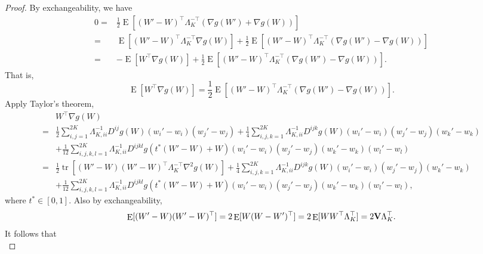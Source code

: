 \documentclass[11pt]{article}
\DeclareMathOperator{\mytr}{tr}
\DeclareMathOperator{\myE}{E}
\theoremstyle{plain}
\theoremstyle{definition}
\theoremstyle{remark}
\begin{document}
\begin{proof}
By exchangeability, we have
\begin{equation*}
    \begin{split}
        0=&\frac 1 2 \myE [(W'-W)^\top \Lambda_K^{-\top} (\nabla g(W') +\nabla g(W))]
        \\
        =& \myE [(W'-W)^\top \Lambda_K^{-\top} \nabla g(W)]
        +\frac{1}{2} \myE [(W'-W)^\top \Lambda_K^{-\top} (\nabla g(W') -\nabla g(W))]
        \\
        =&
        - \myE [W^\top  \nabla g(W)]
        +\frac{1}{2} \myE [(W'-W)^\top \Lambda_K^{-\top} (\nabla g(W') -\nabla g(W))].
    \end{split}
\end{equation*}
That is,
\begin{equation*}
         \myE [W^\top  \nabla g(W)]
         =
        \frac{1}{2} \myE [(W'-W)^\top \Lambda_K^{-\top} (\nabla g(W') -\nabla g(W))].
\end{equation*}
Apply Taylor's theorem,
\begin{equation}
    \begin{split}
         &W^\top  \nabla g(W)
         \\
         =&
         \frac 1 2 \sum_{i,j=1}^{2K}
         \Lambda_{K,ii}^{-1} D^{ij} g(W) (w_i'-w_i) (w_j'-w_j)
         +
         \frac 1 4 \sum_{i,j,k=1}^{2K}
         \Lambda_{K,ii}^{-1} D^{ijk} g(W) (w_i'-w_i) (w_j'-w_j)(w_k'-w_k)
         \\
         &+
         \frac{1}{12} \sum_{i,j,k,l=1}^{2K}
         \Lambda_{K,ii}^{-1} D^{ijkl} g(t^*(W'-W)+W) (w_i'-w_i) (w_j'-w_j)(w_k'-w_k) (w_l'-w_l)
         \\
         =&
         \frac 1 2 
         \mytr
         [
         (W'-W)
         (W'-W)^\top \Lambda_K^{-\top} \nabla^2 g(W)
     ]
         +
         \frac 1 4 \sum_{i,j,k=1}^{2K}
         \Lambda_{K,ii}^{-1} D^{ijk} g(W) (w_i'-w_i) (w_j'-w_j)(w_k'-w_k)
         \\
         &+
         \frac{1}{12} \sum_{i,j,k,l=1}^{2K}
         \Lambda_{K,ii}^{-1} D^{ijkl} g(t^*(W'-W)+W) (w_i'-w_i) (w_j'-w_j)(w_k'-w_k) (w_l'-w_l),
    \end{split}
\end{equation}
where $t^*\in [0,1]$.
Also by exchangeability,
\begin{equation*}
    \myE[(W'-W) (W'-W)^\top] 
    =
    2\myE[ W(W-W')^\top] 
    =
    2\myE[ W W^\top \Lambda_K^\top] 
    =2\BV \Lambda_K^\top.
\end{equation*}
It follows that
\begin{equation*}

\end{equation*}
\end{proof}
\end{document}
